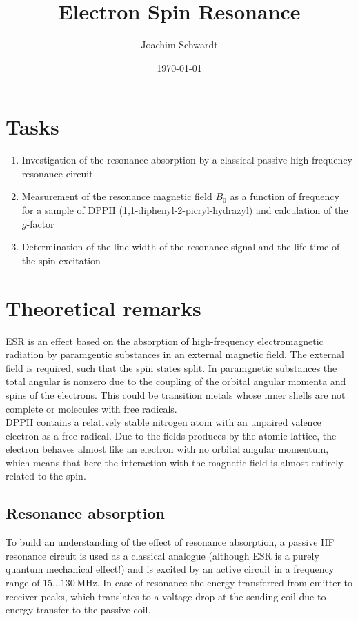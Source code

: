 \documentclass[a4paper,12pt]{article}
\begin{document}
\title{Electron Spin Resonance}
\author{Joachim Schwardt}
\date{\today}
\maketitle

\section{Tasks}
\begin{enumerate}
\item Investigation of the resonance absorption by a classical passive high-frequency resonance circuit
\item Measurement of the resonance magnetic field $B_0$ as a function of frequency for a sample of DPPH (1,1-diphenyl-2-picryl-hydrazyl) and calculation of the $g$-factor
\item Determination of the line width of the resonance signal and the life time of the spin excitation
\end{enumerate}
\section{Theoretical remarks}
ESR is an effect based on the absorption of high-frequency electromagnetic radiation by paramgentic substances in an external magnetic field. The external field is required, such that the spin states split. In paramgnetic substances the total angular is nonzero due to the coupling of the orbital angular momenta and spins of the electrons. This could be transition metals whose inner shells are not complete or molecules with free radicals. \\
DPPH contains a relatively stable nitrogen atom with an unpaired valence electron as a free radical. Due to the fields produces by the atomic lattice, the electron behaves almost like an electron with no orbital angular momentum, which means that here the interaction with the magnetic field is almost entirely related to the spin.
\subsection{Resonance absorption}
To build an understanding of the effect of resonance absorption, a passive HF resonance circuit is used as a classical analogue (although ESR is a purely quantum mechanical effect!) and is excited by an active circuit in a frequency range of $15\dots 130\,$MHz. In case of resonance the energy transferred from emitter to receiver peaks, which translates to a voltage drop at the sending coil due to energy transfer to the passive coil.
\end{document}
